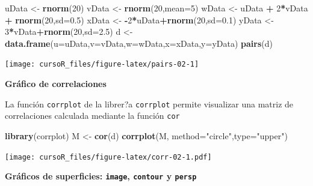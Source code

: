 \documentclass[]{book}
\newenvironment{Shaded}{\begin{snugshade}}{\end{snugshade}}
\newcommand{\KeywordTok}[1]{\textcolor[rgb]{0.13,0.29,0.53}{\textbf{#1}}}
\newcommand{\DataTypeTok}[1]{\textcolor[rgb]{0.13,0.29,0.53}{#1}}
\newcommand{\DecValTok}[1]{\textcolor[rgb]{0.00,0.00,0.81}{#1}}
\newcommand{\FloatTok}[1]{\textcolor[rgb]{0.00,0.00,0.81}{#1}}
\newcommand{\StringTok}[1]{\textcolor[rgb]{0.31,0.60,0.02}{#1}}
\newcommand{\OperatorTok}[1]{\textcolor[rgb]{0.81,0.36,0.00}{\textbf{#1}}}
\newcommand{\NormalTok}[1]{#1}
\begin{document}
\begin{Shaded}
\begin{Highlighting}[]
\NormalTok{uData <-}\StringTok{ }\KeywordTok{rnorm}\NormalTok{(}\DecValTok{20}\NormalTok{)}
\NormalTok{vData <-}\StringTok{ }\KeywordTok{rnorm}\NormalTok{(}\DecValTok{20}\NormalTok{,}\DataTypeTok{mean=}\DecValTok{5}\NormalTok{)}
\NormalTok{wData <-}\StringTok{ }\NormalTok{uData }\OperatorTok{+}\StringTok{ }\DecValTok{2}\OperatorTok{*}\NormalTok{vData }\OperatorTok{+}\StringTok{ }\KeywordTok{rnorm}\NormalTok{(}\DecValTok{20}\NormalTok{,}\DataTypeTok{sd=}\FloatTok{0.5}\NormalTok{)}
\NormalTok{xData <-}\StringTok{ }\OperatorTok{-}\DecValTok{2}\OperatorTok{*}\NormalTok{uData}\OperatorTok{+}\KeywordTok{rnorm}\NormalTok{(}\DecValTok{20}\NormalTok{,}\DataTypeTok{sd=}\FloatTok{0.1}\NormalTok{)}
\NormalTok{yData <-}\StringTok{  }\DecValTok{3}\OperatorTok{*}\NormalTok{vData}\OperatorTok{+}\KeywordTok{rnorm}\NormalTok{(}\DecValTok{20}\NormalTok{,}\DataTypeTok{sd=}\FloatTok{2.5}\NormalTok{)}
\NormalTok{d <-}\StringTok{ }\KeywordTok{data.frame}\NormalTok{(}\DataTypeTok{u=}\NormalTok{uData,}\DataTypeTok{v=}\NormalTok{vData,}\DataTypeTok{w=}\NormalTok{wData,}\DataTypeTok{x=}\NormalTok{xData,}\DataTypeTok{y=}\NormalTok{yData)}
\KeywordTok{pairs}\NormalTok{(d)}
\end{Highlighting}
\end{Shaded}

\begin{center}\texttt{[image: cursoR\_files/figure-latex/pairs-02-1]} \end{center}

\textbf{Gráfico de correlaciones}

La función \texttt{corrplot} de la librer?a \texttt{corrplot} permite
visualizar una matriz de correlaciones calculada mediante la función
\texttt{cor}

\begin{Shaded}
\begin{Highlighting}[]
\KeywordTok{library}\NormalTok{(corrplot)}
\NormalTok{M <-}\StringTok{ }\KeywordTok{cor}\NormalTok{(d)}
\KeywordTok{corrplot}\NormalTok{(M, }\DataTypeTok{method=}\StringTok{"circle"}\NormalTok{,}\DataTypeTok{type=}\StringTok{"upper"}\NormalTok{)}
\end{Highlighting}
\end{Shaded}

\texttt{[image: cursoR\_files/figure-latex/corr-02-1.pdf]}

\textbf{Gráficos de superficies: \texttt{image}, \texttt{contour} y
\texttt{persp}}
\end{document}
